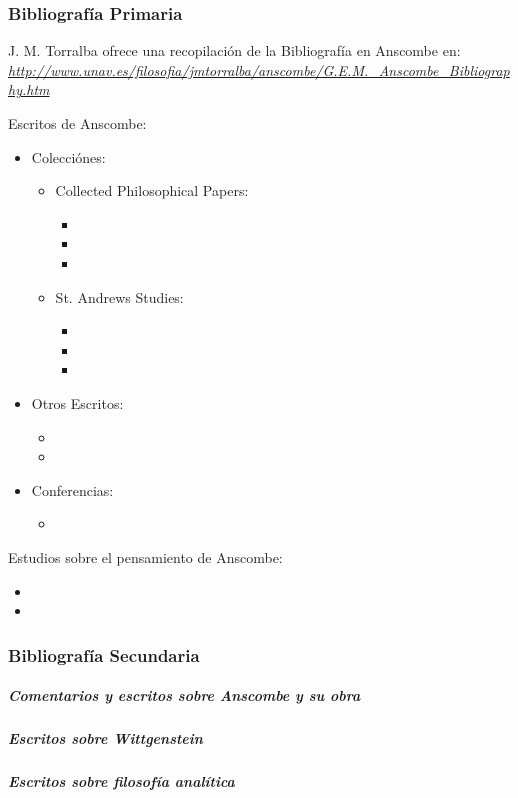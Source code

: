 \subsubsection{Bibliografía Primaria}
\noindent J. M. Torralba ofrece una recopilación de la Bibliografía en Anscombe en:\\
\emph{\href{http://www.unav.es/filosofia/jmtorralba/anscombe/G.E.M.\_Anscombe\_Bibliography.htm}{http://www.unav.es/filosofia/jmtorralba/anscombe/G.E.M.\_Anscombe\_Bibliography.htm}}

\noindent Escritos de Anscombe:

\begin{itemize}
    \item Colecciónes:
      \begin{itemize}
          \item Collected Philosophical Papers:
            \begin{itemize}
                \item {}
                \item {}
                \item {}
            \end{itemize}

          \item St. Andrews Studies:
            \begin{itemize}
                \item {}
                \item {}
                \item {}
            \end{itemize}
      \end{itemize}
    \item Otros Escritos:
      \begin{itemize}
        \item {}
        \item {}
      \end{itemize}
    \item Conferencias:
      \begin{itemize}
        \item {}
      \end{itemize}

\end{itemize}

\noindent Estudios sobre el pensamiento de Anscombe:

\begin{itemize}
    \item {}
    \item {}
\end{itemize}

\subsubsection{Bibliografía Secundaria}
\subparagraph{Comentarios y escritos sobre Anscombe y su obra}
\subparagraph{Escritos sobre Wittgenstein}
\subparagraph{Escritos sobre filosofía analítica}

